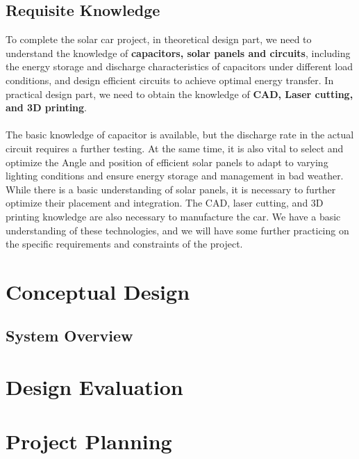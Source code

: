 \documentclass[12pt]{article}
\begin{document}
\subsection{Requisite Knowledge}
To complete the solar car project, in theoretical design part, we need to understand the knowledge of \textbf{capacitors, solar panels and circuits}, 
including the energy storage and discharge characteristics of capacitors under different load conditions, 
and design efficient circuits to achieve optimal energy transfer. In practical design part, we need to obtain the knowledge of \textbf{CAD, Laser cutting, and 3D printing}. 
\\
\\
The basic knowledge of capacitor is available, but the discharge rate in the actual circuit requires a further testing. 
At the same time, it is also vital to select and optimize the Angle and position of efficient solar panels to adapt 
to varying lighting conditions and ensure energy storage and management in bad weather. While there is a basic understanding of solar panels, 
it is necessary to further optimize their placement and integration. The CAD, laser cutting, and 3D printing knowledge are also necessary to manufacture the car.
We have a basic understanding of these technologies, and we will have some further practicing on the specific requirements and constraints of the project. 

\section{Conceptual Design}
\subsection{System Overview}
    
\section{Design Evaluation}

\section{Project Planning}
\end{document}
